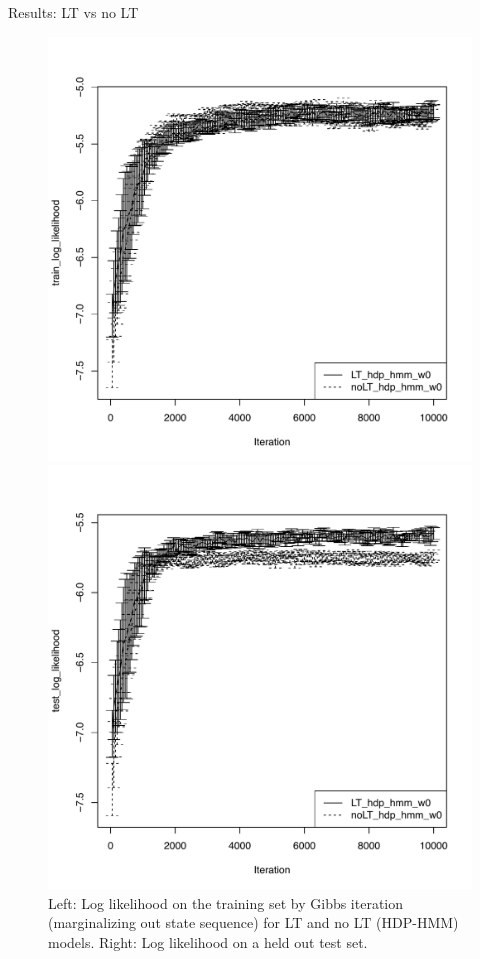 \documentclass[11pt, mathserif, handout, table]{beamer}
\begin{document}
\begin{frame}{Results: LT vs no LT}
\begin{figure}
\begin{minipage}{0.45\textwidth}
\includegraphics[width=\textwidth]{img/block_diag/train_log_likelihood}
\end{minipage}
\hspace{0.1in}
\begin{minipage}{0.45\textwidth}
\includegraphics[width=\textwidth]{img/block_diag/test_log_likelihood}
\end{minipage}
\caption{Left: Log likelihood on the training set by Gibbs iteration
  (marginalizing out state sequence) for LT and no LT (HDP-HMM)
  models.  Right: Log likelihood on a held out test set.}
\end{figure}
\end{frame}
\end{document}
